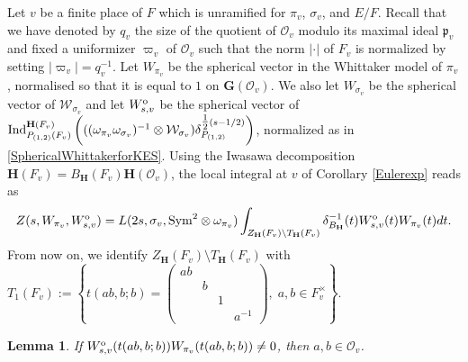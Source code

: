 \documentclass[11pt, reqno]{amsart}
\theoremstyle{plain}
\newtheorem{lemma}[theorem]{Lemma}
\theoremstyle{definition}
\theoremstyle{remark}
\theoremstyle{plain}
\def\H{{H}}
\def\G{\mathbf{G}}
\def\H{\mathbf{H}}
\begin{document}
Let $v$ be a finite place of $F$ which is unramified for $\pi_v$, $\sigma_v$, and $E/F$. Recall that we have denoted by $q_v$ the size of the quotient of $\mathcal{O}_v$ modulo its maximal ideal $\mathfrak{p}_v$ and fixed a uniformizer  $\varpi_v$ of $\mathcal{O}_v$ such that the norm $|\cdot |$ of $F_v$ is normalized by setting $|\varpi_v| = q_v^{-1}$. Let $W_{\pi_v}$ be the spherical vector in the Whittaker model of $\pi_v$, normalised so that it is equal to $1$ on $\G(\mathcal{O}_v)$. We also let  $W_{\sigma_v}$  be the spherical vector of $\mathcal{W}_{\sigma_v}$ and let $W_{s,v}^{\rm o}$ be the spherical vector of ${\rm Ind}_{P_{(1,2)}(F_v)}^{\H(F_v)}\left(((\omega_{\pi_v}\omega_{\sigma_v})^{-1}\otimes\mathcal{W}_{\sigma_v})\delta_{P_{(1,2)}}^{\tfrac{1}{2}(s-1/2)}\right)$, normalized as in \eqref{SphericalWhittakerforKES}. Using the Iwasawa decomposition $\H(F_v) = B_\H(F_v) \H(\mathcal{O}_v)$, the local integral  at $v$ of Corollary \ref{Eulerexp} reads as
\[Z(s,W_{\pi_v},W_{s,v}^{\rm o}) = L(2s, \sigma_v, {\rm Sym}^2\otimes \omega_{\pi_v} ) \int_{Z_\H(F_v)\setminus T_{\H}(F_v)}\delta_{B_\H}^{-1}(t) W_{s,v}^{\rm o}(t)W_{\pi_v}(t)dt.\]
From now on, we identify $Z_\H(F_v) \setminus T_{\H}(F_v)$ with $T_{1}(F_v) := \left\{t(ab,b;b) = \left(\begin{smallmatrix}ab& & & \\ &b& & \\ & &1& \\ & & &a^{-1}\end{smallmatrix}\right),\;a,b\in F_v^{\times}\right\}$. 
\begin{lemma}\label{stupidbounds}
If $W_{s,v}^{\rm o}(t(ab,b;b))W_{\pi_v}(t(ab,b;b))\neq 0$, then $a,b\in\mathcal{O}_v$.
\end{lemma}
\end{document}

